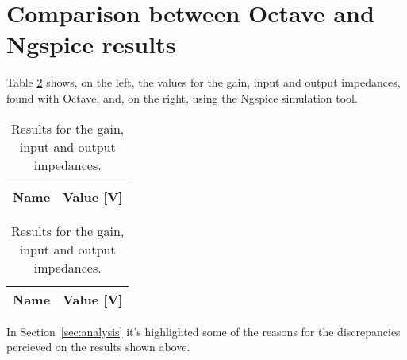 \section{Comparison between Octave and Ngspice results}
\label{sec:comparison}

\par Table \ref{tab:results_compar} shows, on the left, the values for the gain, input and
output impedances, found with Octave, and, on the right, using the Ngspice simulation tool.

\begin{table}[htb!]
  \centering
  \begin{tabular}{|l|r|}
      \hline    
      {\bf Name} & {\bf Value [V]} \\ \hline
      
  \end{tabular}
\quad
  \begin{tabular}{|l|r|}
    \hline    
    {\bf Name} & {\bf Value [V]} \\ \hline
    
    
    
    
  \end{tabular}
  \caption{Results for the gain, input and output impedances.}
  \label{tab:results_compar}
\end{table}

\par In Section~\ref{sec:analysis} it's highlighted some of the reasons for the discrepancies
percieved on the results shown above.

